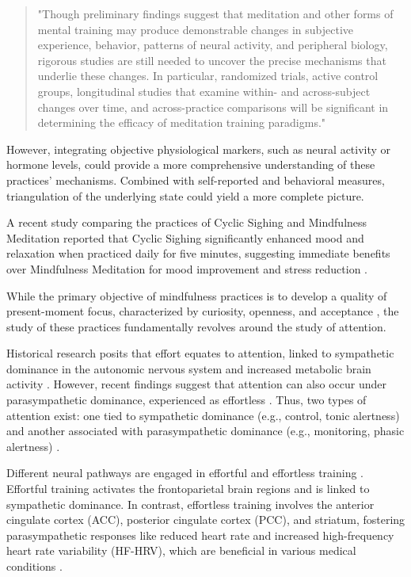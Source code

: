 \begin{quote}
"Though preliminary findings suggest that meditation and other forms of mental training may produce demonstrable changes in subjective experience, behavior, patterns of neural activity, and peripheral biology, rigorous studies are still needed to uncover the precise mechanisms that underlie these changes. In particular, randomized trials, active control groups, longitudinal studies that examine within- and across-subject changes over time, and across-practice comparisons will be significant in determining the efficacy of meditation training paradigms."
\end{quote}

However, integrating objective physiological markers, such as neural activity or hormone levels, could provide a more comprehensive understanding of these practices' mechanisms. Combined with self-reported and behavioral measures, triangulation of the underlying state could yield a more complete picture. \cite{SmallwoodSchooler2015}\cite{Schooler2004}

A recent study comparing the practices of Cyclic Sighing and Mindfulness Meditation reported that Cyclic Sighing significantly enhanced mood and relaxation when practiced daily for five minutes, suggesting immediate benefits over Mindfulness Meditation for mood improvement and stress reduction \cite{huberman2022contemplative}.

While the primary objective of mindfulness practices is to develop a quality of present-moment focus, characterized by curiosity, openness, and acceptance \cite{deconReconSelf}, the study of these practices fundamentally revolves around the study of attention.

Historical research posits that effort equates to attention, linked to sympathetic dominance in the autonomic nervous system and increased metabolic brain activity \cite{Kahneman1973AttentionAE}. However, recent findings suggest that attention can also occur under parasympathetic dominance, experienced as effortless \cite{Tang2019PromotingPW}\cite{BruyaTang2018}. Thus, two types of attention exist: one tied to sympathetic dominance (e.g., control, tonic alertness) and another associated with parasympathetic dominance (e.g., monitoring, phasic alertness) \cite{posner2015}\cite{posner2020_2022}.

Different neural pathways are engaged in effortful and effortless training \cite{posner2020_2022}. Effortful training activates the frontoparietal brain regions and is linked to sympathetic dominance. In contrast, effortless training involves the anterior cingulate cortex (ACC), posterior cingulate cortex (PCC), and striatum, fostering parasympathetic responses like reduced heart rate and increased high-frequency heart rate variability (HF-HRV), which are beneficial in various medical conditions \cite{singer2016training}\cite{HRV}.


